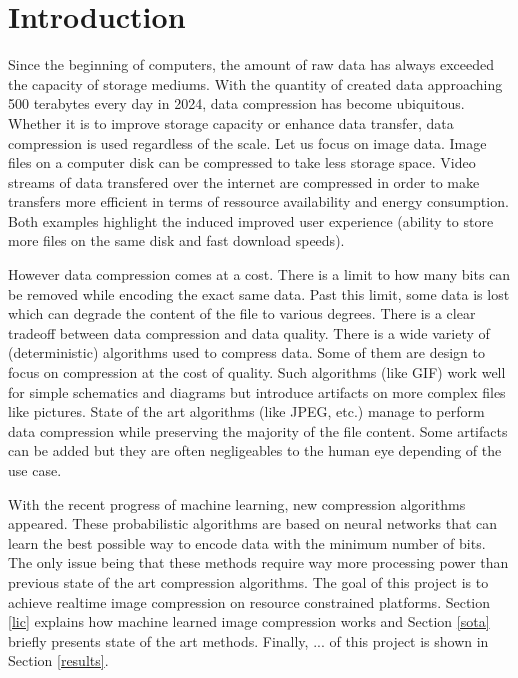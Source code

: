 \chapter*{Introduction}
Since the beginning of computers, the amount of raw data has always exceeded the capacity of storage mediums. With the quantity of created data approaching 500 terabytes every day in 2024, data compression has become ubiquitous. Whether it is to improve storage capacity or enhance data transfer, data compression is used regardless of the scale. Let us focus on image data. Image files on a computer disk can be compressed to take less storage space. Video streams of data transfered over the internet are compressed in order to make transfers more efficient in terms of ressource availability and energy consumption. Both examples highlight the induced improved user experience (ability to store more files on the same disk and fast download speeds).

However data compression comes at a cost. There is a limit to how many bits can be removed while encoding the exact same data. Past this limit, some data is lost which can degrade the content of the file to various degrees. There is a clear tradeoff between data compression and data quality. There is a wide variety of (deterministic) algorithms used to compress data. Some of them are design to focus on compression at the cost of quality. Such algorithms (like GIF) work well for simple schematics and diagrams but introduce artifacts on more complex files like pictures. State of the art algorithms (like JPEG, etc.) manage to perform data compression while preserving the majority of the file content. Some artifacts can be added but they are often negligeables to the human eye depending of the use case.

With the recent progress of machine learning, new compression algorithms appeared. These probabilistic algorithms are based on neural networks that can learn the best possible way to encode data with the minimum number of bits. The only issue being that these methods require way more processing power than previous state of the art compression algorithms. The goal of this project is to achieve realtime image compression on resource constrained platforms. Section \ref{lic} explains how machine learned image compression works and Section \ref{sota} briefly presents state of the art methods. Finally, ... of this project is shown in Section \ref{results}.